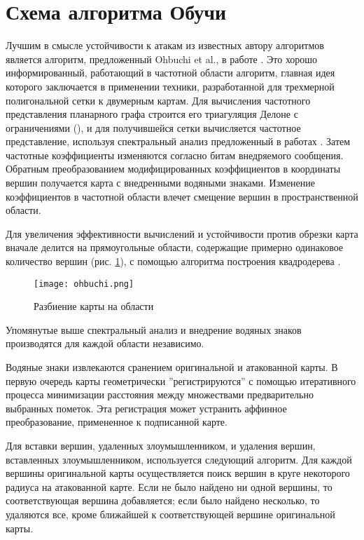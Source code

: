 \section{Схема алгоритма Обучи}
\label{sec:base}

Лучшим в смысле устойчивости к атакам из известных автору алгоритмов является алгоритм, предложенный 
Ohbuchi et al., в работе \cite{Ohbuchi}. Это хорошо информированный, работающий в частотной области алгоритм,
главная идея которого заключается в применении техники, разработанной для трехмерной полигональной сетки к
двумерным картам.
Для вычисления частотного представления планарного графа строится его триагуляция Делоне с ограничениями 
(\cite{Chew}), и для получившейся сетки вычисляется частотное представление, используя спектральный анализ 
предложенный в работах \cite{Karni1, Karni2}. Затем частотные коэффициенты изменяются согласно битам 
внедряемого сообщения. Обратным преобразованием модифицированных коэффициентов в координаты вершин получается
карта с внедренными водяными знаками. Изменение коэффициентов в частотной области влечет смещение вершин в 
пространственной области.

Для увеличения эффективности вычислений и устойчивости против обрезки карта вначале делится на прямоугольные 
области, содержащие примерно одинаковое количество вершин (рис. \ref{pic_ohbuchi}), с помощью алгоритма
построения квадродерева \cite{Samet}. 
\begin{figure}[h]
  \centering
  \texttt{[image: ohbuchi.png]}
  \caption{Разбиение карты на области}
  \label{pic_ohbuchi}
\end{figure}
Упомянутые выше спектральный анализ и внедрение водяных знаков производятся для каждой области независимо.

Водяные знаки извлекаются сранением оригинальной и атакованной карты. В первую очередь карты геометрически
''регистрируются'' с помощью итеративного процесса минимизации расстояния между множествами предварительно
выбранных пометок. Эта регистрация может устранить аффинное преобразование, примененное к подписанной карте.

Для вставки вершин, удаленных злоумышленником, и удаления вершин, вставленных злоумышленником, используется 
следующий алгоритм. Для каждой вершины оригинальной
карты осуществляется поиск вершин в круге некоторого радиуса на атакованной карте. Если не было найдено ни одной
вершины, то соответствующая вершина добавляется; если было найдено несколько, то удаляются все, кроме ближайшей
к соответствующей вершине оригинальной карты.

